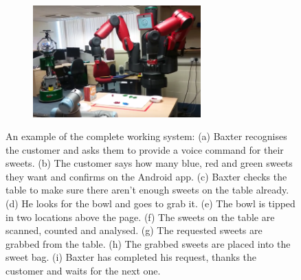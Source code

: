 \begin{figure}[H]
{\begin{subfigure}[b]{.43\textwidth}
\end{subfigure}%
\begin{subfigure}[b]{.43\textwidth}
\centering
\caption{}
\includegraphics[width=.95\textwidth, height=4.3cm]{13.png}
\end{subfigure}%
}
\caption{An example of the complete working system: (a) Baxter recognises the customer and asks them to provide a voice command for their sweets. (b) The customer says how many blue, red and green sweets they want and confirms on the Android app. (c) Baxter checks the table to make sure there aren't enough sweets on the table already. (d) He looks for the bowl and goes to grab it. (e) The bowl is tipped in two locations above the page. (f) The sweets on the table are scanned, counted and analysed. (g) The requested sweets are grabbed from the table. (h) The grabbed sweets are placed into the sweet bag. (i) Baxter has completed his request, thanks the customer and waits for the next one.}
\label{fig:completeSystem}
\end{figure}
